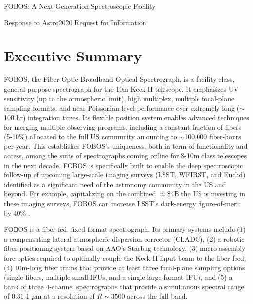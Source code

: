 \documentclass[oneside,11pt]{amsart}
\begin{document}


\vspace*{-1.5cm}

\centerline{\textsf {\Large FOBOS: A Next-Generation Spectroscopic Facility}}
\centerline{\textsf {\large Response to Astro2020 Request for Information}}

\setcounter{page}{1}

\section*{Executive Summary}


 FOBOS, the Fiber-Optic Broadband
Optical Spectrograph, is a facility-class, general-purpose
spectrograph for the 10m Keck II telescope. It emphasizes UV
sensitivity (up to the atmospheric limit), high multiplex, multiple
focal-plane sampling formats, and near Poissonian-level performance
over extremely long ($\sim$100 hr) integration times. Its flexible
position system enables advanced techniques for merging multiple
observing programs, including a constant fraction of fibers (5-10\%)
allocated to the full US community amounting to $\sim$100,000
fiber-hours per year. This establishes FOBOS's uniqueness, both in
term of functionality and access, among the suite of spectrographs
coming online for 8-10m class telescopes in the next decade. FOBOS is
specifically built to enable the deep spectroscopic follow-up of
upcoming large-scale imaging surveys (LSST, WFIRST, and Euclid)
identified as a significant need of the astronomy community in the US
and beyond. For example, capitalizing on the combined $\approx$\$4B
the US is investing in these imaging surveys, FOBOS can increase
LSST's dark-energy figure-of-merit by 40\% \citet{newman15}.

\smallskip

 FOBOS is a fiber-fed,
fixed-format spectrograph. Its primary systems include (1) a
compensating lateral atmospheric dispersion corrector (CLADC), (2) a
robotic fiber-positioning system based on AAO's Starbug technology,
(3) micro-assembly fore-optics required to optimally couple the Keck
II input beam to the fiber feed, (4) 10m-long fiber trains that
provide at least three focal-plane sampling options (single fibers,
multiple small IFUs, and a single large-format IFU), and (5) a bank
of three 4-channel spectrographs that provide a simultanous spectral
range of 0.31-1 $\mu$m at a resolution of $R\sim3500$ across the full
band.
\end{document}

